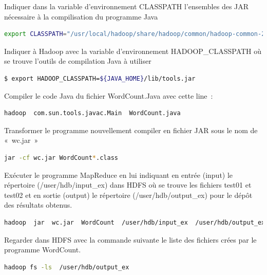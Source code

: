 \documentclass[12pt,french]{book}
\begin{document}
Indiquer dans la variable d’environnement CLASSPATH l’ensembles des JAR nécessaire à la compilisation du programme Java

\begin{lstlisting}[language=bash, frame=single, breaklines=true, postbreak=\mbox{\textcolor{red}{$\hookrightarrow$}\space}]
export CLASSPATH="/usr/local/hadoop/share/hadoop/common/hadoop-common-2.8.0.jar:/usr/local/hadoop/share/hadoop/mapreduce/hadoop-mapreduce-client-common-2.8.0.jar:/usr/local/hadoop/share/hadoop/common/lib/commons-cli-1.2.jar:/usr/local/hadoop/share/hadoop/mapreduce/hadoop-mapreduce-client-core-2.8.0.jar"
\end{lstlisting}

Indiquer à Hadoop avec la variable d’environnement HADOOP\_CLASSPATH où se trouve l’outils de compilation Java à utiliser

\begin{lstlisting}[language=bash, frame=single]
$ export HADOOP_CLASSPATH=${JAVA_HOME}/lib/tools.jar
\end{lstlisting}

Compiler le code Java du fichier WordCount.Java avec cette line :

\begin{lstlisting}[language=bash, frame=single]
hadoop  com.sun.tools.javac.Main  WordCount.java 
\end{lstlisting}

Transformer le programme nouvellement compiler en fichier JAR sous le nom de « wc.jar »

\begin{lstlisting}[language=bash, frame=single]
jar -cf wc.jar WordCount*.class
\end{lstlisting}

Exécuter le programme MapReduce en lui indiquant en entrée (input) le répertoire (/user/hdb/input\_ex) dans HDFS où se trouve les fichiers test01 et test02 et en sortie (output) le répertoire (/user/hdb/output\_ex) pour le dépôt des résultats obtenus. 

\begin{lstlisting}[language=bash, frame=single]
hadoop  jar  wc.jar  WordCount  /user/hdb/input_ex  /user/hdb/output_ex
\end{lstlisting}

Regarder dans HDFS avec la commande suivante le liste des fichiers crées par le programme WordCount.

\begin{lstlisting}[language=bash, frame=single]
hadoop fs -ls  /user/hdb/output_ex
\end{lstlisting}
\end{document}
